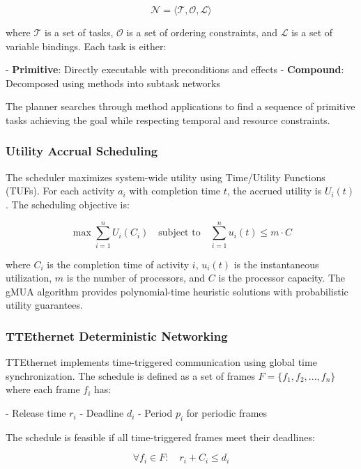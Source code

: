 \documentclass[10pt, conference, compsocconf]{IEEEtran}
\begin{document}
\begin{equation}
\mathcal{N} = \langle \mathcal{T}, \mathcal{O}, \mathcal{L} \rangle
\end{equation}

where $\mathcal{T}$ is a set of tasks, $\mathcal{O}$ is a set of ordering constraints, and $\mathcal{L}$ is a set of variable bindings. Each task is either:

- \textbf{Primitive}: Directly executable with preconditions and effects
- \textbf{Compound}: Decomposed using methods into subtask networks

The planner searches through method applications to find a sequence of primitive tasks achieving the goal while respecting temporal and resource constraints\cite{zhang2024spacecraft}.

\subsubsection{Utility Accrual Scheduling}
The scheduler maximizes system-wide utility using Time/Utility Functions (TUFs)\cite{scienceDirectUA}. For each activity $a_i$ with completion time $t$, the accrued utility is $U_i(t)$. The scheduling objective is:

\begin{equation}
\max \sum_{i=1}^{n} U_i(C_i) \quad \text{subject to} \quad \sum_{i=1}^{n} u_i(t) \leq m \cdot C
\end{equation}

where $C_i$ is the completion time of activity $i$, $u_i(t)$ is the instantaneous utilization, $m$ is the number of processors, and $C$ is the processor capacity\cite{scienceDirectUA}. The gMUA algorithm provides polynomial-time heuristic solutions with probabilistic utility guarantees.

\subsubsection{TTEthernet Deterministic Networking}
TTEthernet implements time-triggered communication using global time synchronization\cite{tttechethernet}. The schedule is defined as a set of frames $F = \{f_1, f_2, ..., f_n\}$ where each frame $f_i$ has:

- Release time $r_i$
- Deadline $d_i$
- Period $p_i$ for periodic frames

The schedule is feasible if all time-triggered frames meet their deadlines:

\begin{equation}
\forall f_i \in F: \quad r_i + C_i \leq d_i
\end{equation}
\end{document}
